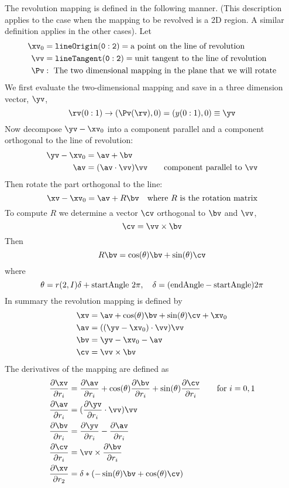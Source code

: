 The revolution mapping is defined in the following manner. (This description applies to the case
when the mapping to be revolved is a 2D region. A similar definition applies in the other cases).
Let
\begin{align*}
    \xv_0 &= {\tt lineOrigin(0:2)} = \mbox{a point on the line of revolution} \\
    \vv   &= {\tt lineTangent(0:2)} = \mbox{unit tangent to the line of revolution} \\
    \Pv   &:~  \mbox{The two dimensional mapping in the plane that we will rotate}
\end{align*}
We first evaluate the two-dimensional mapping and save in a three dimension vector, $\yv$,
\[
                   \rv(0:1) \rightarrow (\Pv(\rv),0) = (y(0:1),0)  \equiv \yv
\]
Now decompose $\yv-\xv_0$ into a component parallel             and a component
orthogonal to the line of revolution:
\begin{align*}
        \yv-\xv_0 &= \av + \bv \\      
    \av &=  (\av\cdot\vv) \vv \qquad \mbox{component parallel to $\vv$}
\end{align*}
Then rotate the part orthogonal to the line:
\[
      \xv-\xv_0 = \av + R \bv  \quad \mbox{where  $R$ is the rotation matrix}
\]
To compute $R$ we determine a vector $\cv$ orthogonal to $\bv$ and $\vv$,
\[
             \cv = \vv \times \bv
\]
Then
\[
         R \bv = \cos(\theta) \bv + \sin(\theta) \cv
\]
where
\[
          \theta = r(2,I) \delta+{\rm startAngle} ~2\pi, \quad \delta={\rm (endAngle-startAngle)} 2 \pi
\]
In summary the revolution mapping is defined by
\begin{align*}
        \xv &= \av + \cos(\theta)\bv + \sin(\theta)\cv + \xv_0 \\
        \av &= ((\yv-\xv_0)\cdot\vv)\vv  \\
        \bv &= \yv-\xv_0-\av \\
        \cv &= \vv \times \bv
\end{align*}
The derivatives of the mapping are defined as
\begin{align*}
   {\partial \xv \over \partial r_i} &=  {\partial \av \over \partial r_i} + 
                \cos(\theta) {\partial \bv \over \partial r_i} 
              + \sin(\theta) {\partial \cv \over \partial r_i} \qquad \mbox{for $i=0,1$} \\
         {\partial \av \over \partial r_i} &= ({\partial \yv \over \partial r_i}\cdot\vv)\vv \\
         {\partial \bv \over \partial r_i} &= {\partial \yv \over \partial r_i} - {\partial \av \over \partial r_i} \\
         {\partial \cv \over \partial r_i} &= \vv \times {\partial \bv \over \partial r_i} \\
    {\partial \xv \over \partial r_2}  &= \delta*( -\sin(\theta)\bv +\cos(\theta)\cv )
\end{align*}


